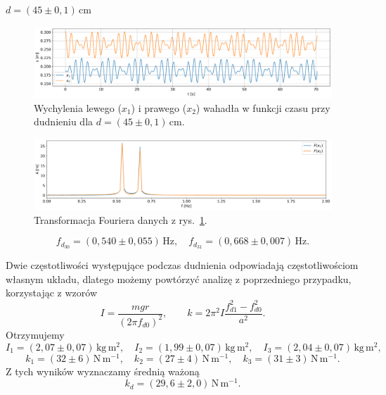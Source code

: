 \documentclass[12pt]{article}
\begin{document}
\(d = (45 \pm 0{,}1)\,\mathrm{cm}\)
\begin{figure}[H]
	\centering
	\includegraphics[width=\linewidth]{beats_3}
	\caption{Wychylenia lewego (\(x_1\)) i prawego (\(x_2\)) wahadła w funkcji czasu przy dudnieniu dla \(d = (45 \pm 0{,}1)\,\mathrm{cm}\).}
	\label{fig:beats_2}
\end{figure}
\begin{figure}[H]
	\centering
	\includegraphics[width=\linewidth]{beats_3_fft}
	\caption{Transformacja Fouriera danych z rys.~\ref{fig:beats_2}.}
	\label{fig:coutner_phase_2_fft}
\end{figure}
\[
	f_{d_{30}} = (0{,}540 \pm 0{,}055)\,\mathrm{Hz}, \quad
	f_{d_{31}} = (0{,}668 \pm 0{,}007)\,\mathrm{Hz}.
\]

Dwie częstotliwości występujące podczas dudnienia odpowiadają częstotliwościom własnym układu\cite{skrypt}, dlatego możemy powtórzyć analizę z poprzedniego przypadku, korzystając z wzorów
\[
	I = \frac{mgr}{(2\pi f_{d0})^2}, \qquad
	k = 2\pi^2 I \frac{f_{d1}^2 - f_{d0}^2}{a^2}.
\]
Otrzymujemy
\[
	I_1 = (2{,}07 \pm 0{,}07)\,\mathrm{kg\,m^2}, \quad
	I_2 = (1{,}99 \pm 0{,}07)\,\mathrm{kg\,m^2}, \quad
	I_3 = (2{,}04 \pm 0{,}07)\,\mathrm{kg\,m^2},
\]
\[
	k_1 = (32 \pm 6)\,\mathrm{N\,m^{-1}}, \quad
	k_2 = (27 \pm 4)\,\mathrm{N\,m^{-1}}, \quad
	k_3 = (31 \pm 3)\,\mathrm{N\,m^{-1}}.
\]
Z tych wyników wyznaczamy średnią ważoną
\[
	k_d = (29{,}6 \pm 2{,}0)\,\mathrm{N\,m^{-1}}.
\]
\end{document}
